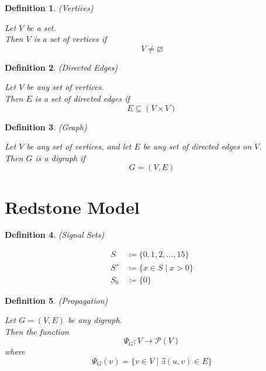 \documentclass{article}
\newtheorem{defn}{Definition}[section]
\begin{document}
\medskip

\begin{defn} (Vertices)
	
	Let \(V\) be a set. \\
	Then \(V\) is a set of vertices if
	\begin{equation}
		V \neq \varnothing
	\end{equation}
\end{defn}

\medskip

\begin{defn} (Directed Edges)
	
	Let \(V\) be any set of vertices. \\
	Then \(E\) is a set of directed edges if 
	\begin{equation}
		E \subseteq (V \times V)
	\end{equation}
\end{defn}

\medskip

\begin{defn} (Graph)
	
		Let \(V\) be any set of vertices, and let \(E\) be any set of directed edges on \(V\). \\
		Then \(G\) is a digraph if
		\begin{equation}
			G = (V, E)
		\end{equation}
\end{defn}

\section{Redstone Model}

\begin{defn} (Signal Sets)
	\label{defn:signals}
	
	\begin{align}
		S &\coloneq \{0, 1, 2, ..., 15\} \\
		S^+ &\coloneq \{x \in S \mid x > 0\} \\
		S_{0} &\coloneq \{0\}
	\end{align}
\end{defn}

\medskip

\begin{defn} (Propagation)
	\label{defn:propegation}
	
Let \(G = (V, E)\) be any digraph. \\
Then the function
\begin{equation}
	\Psi_{G} : V \rightarrow \mathcal{P}(V) 
\end{equation}
where
\begin{equation*}
	\Psi_{G}(v) = 
	\{v \in V \mid \exists (u, v) \in E\}
\end{equation*}
\end{defn}
\end{document}

